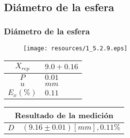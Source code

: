 \documentclass[letter,11pt]{beamer}
\begin{document}
\subsection{Diámetro de la esfera}
\begin{frame}
\frametitle{Diámetro de la esfera}
\vspace*{0.8cm}
\begin{figure}
\centering
\texttt{[image: resources/1\_5.2.9.eps]}
\end{figure}
\vspace*{0.4cm}
\scriptsize
\begin{tabular}{|c|>{\centering}m{1.8cm}<{\centering}|}
\hline
$X_{rep}$ &  $9.0+0.16$ \tabularnewline \hline
      $P$ &      $0.01$ \tabularnewline \hline
      $u$ &        $mm$ \tabularnewline \hline
$E_x(\%)$ &      $0.11$ \tabularnewline \hline
\end{tabular}
\quad
\begin{tabular}{|c|>{\centering}m{5.7cm}<{\centering}|}
\hline
\multicolumn{2}{|c|}{\textbf{Resultado de la medición}} \\ \hline
$D$ & $( 9.16\pm0.01)[mm], 0.11\%$ \tabularnewline \hline
\end{tabular}
\end{frame}
\end{document}
